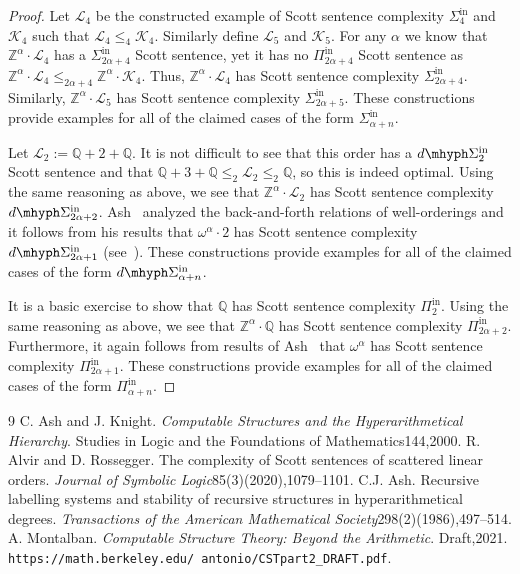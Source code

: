 \documentclass[10pt,a4paper]{amsart}
\providecommand{\L}{\mathcal{L}}
\providecommand{\Pinf}[1]{\Pi^{\mathrm{in}}_{#1}}
\providecommand{\Sinf}[1]{\Sigma^{\mathrm{in}}_{#1}}
\providecommand{\dSinf}[1]{d\mhyph\Sigma^{\mathrm{in}}_{#1}}
\newcommand{\Q}{\mathbb{Q}}
\newcommand{\Z}{\mathbb{Z}}
\newcommand{\K}{\mathcal{K}}
\renewcommand{\L}{\mathcal{L}}
\begin{document}
\begin{proof}
Let $\L_4$ be the constructed example of Scott sentence complexity $\Sinf4$ and $\K_4$ such that $\L_4\leq_4 \K_4$. 
Similarly define $\L_5$ and $\K_5$.
For any $\alpha$ we know that $\Z^\alpha\cdot \L_4$ has a $\Sinf{2\alpha+4}$
Scott sentence, yet it has no $\Pinf{2\alpha+4}$ Scott sentence as
$\Z^\alpha\cdot \L_4\leq_{2\alpha+4} \Z^\alpha\cdot \K_4$. Thus, $\Z^\alpha\cdot
\L_4$ has Scott sentence complexity $\Sinf{2\alpha+4}$. Similarly, $\Z^\alpha\cdot \L_5$ has Scott sentence complexity $\Sinf{2\alpha+5}$. These constructions provide examples for all of the claimed cases of the form $\Sinf{\alpha+n}$.

Let $\L_2:=\Q+2+\Q$. It is not difficult to see that this order has a $\dSinf2$
Scott sentence and that $\Q+3+\Q\leq_2 \L_2\leq_2 \Q$, so this is indeed
optimal. Using the same reasoning as above, we see that $\Z^\alpha\cdot \L_2$
has Scott sentence complexity $\dSinf{2\alpha+2}$. Ash~\cite{ash1986} analyzed
the back-and-forth relations of well-orderings and it follows from his results
that $\omega^\alpha\cdot 2$ has Scott sentence complexity $\dSinf{2\alpha+1}$
(see~\cite[proof of Proposition 19]{AR20}). These constructions provide examples
for all of the claimed cases of the form $\dSinf{\alpha+n}$.

It is a basic exercise to show that $\Q$ has Scott sentence complexity $\Pinf2$.
Using the same reasoning as above, we see that $\Z^\alpha\cdot \Q$ has Scott
sentence complexity $\Pinf{2\alpha+2}$. Furthermore, it again follows from
results of Ash~\cite{ash1986} that $\omega^\alpha$ has Scott sentence complexity
$\Pinf{2\alpha+1}$. These constructions provide examples for all of the claimed
cases of the form $\Pinf{\alpha+n}$. \end{proof}

\begin{thebibliography}{9}
 C. Ash and J. Knight. \emph{Computable Structures and the Hyperarithmetical Hierarchy}. Studies in Logic and the Foundations of Mathematics144,2000.
 R. Alvir and D. Rossegger. The complexity of Scott sentences of scattered linear orders. \emph{Journal of Symbolic Logic}85(3)(2020),1079--1101.
 C.J. Ash. Recursive labelling systems and stability of recursive structures in hyperarithmetical degrees. \emph{Transactions of the American Mathematical Society}298(2)(1986),497--514.
 A. Montalban. \emph{Computable Structure Theory: Beyond the Arithmetic}. Draft,2021. \texttt{https://math.berkeley.edu/\string~antonio/CSTpart2\_DRAFT.pdf}.
\end{thebibliography}
\end{document}
